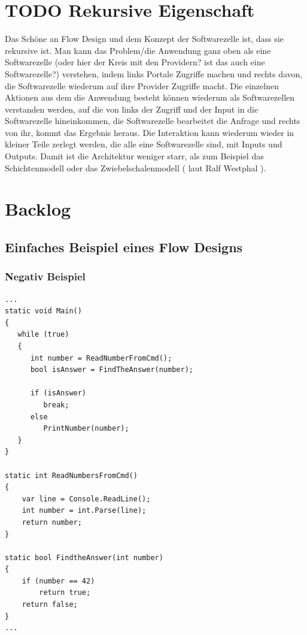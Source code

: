 \documentclass[a4paper,12pt,oneside]{book}
\begin{document}
\chapter{{\bfseries\sffamily TODO} Rekursive Eigenschaft}
\label{sec-6}
Das Schöne an Flow Design und dem Konzept der Softwarezelle ist, dass sie rekursive ist.
Man kann das Problem/die Anwendung ganz oben als eine Softwarezelle (oder hier der Kreis mit den Providern? ist das auch eine Softwarezelle?)
verstehen, indem links Portale Zugriffe machen und rechts davon, die Softwarezelle wiederum auf ihre Provider Zugriffe macht.
Die einzelnen Aktionen aus dem die Anwendung besteht können wiederum als Softwarezellen verstanden werden, auf die von links
der Zugriff und der Input in die Softwarezelle hineinkommen, die Softwarezelle bearbeitet die Anfrage und rechts von ihr, kommt das
Ergebnis heraus. Die Interaktion kann wiederum wieder in kleiner Teile zerlegt werden, die alle eine Softwarezelle sind, mit Inputs und
Outputs. Damit ist die Architektur weniger starr, als zum Beispiel das Schichtenmodell oder das Zwiebelschalenmodell ( laut Ralf Westphal ).



\chapter{Backlog}
\label{sec-7}
\section{Einfaches Beispiel eines Flow Designs}
\label{sec-7-1}
\subsection{Negativ Beispiel}
\label{sec-7-1-1}
\begin{verbatim}
...
static void Main()
{
   while (true)
   {
      int number = ReadNumberFromCmd();
      bool isAnswer = FindTheAnswer(number);

      if (isAnswer)
         break;
      else
         PrintNumber(number);
   }
}

static int ReadNumbersFromCmd()
{
    var line = Console.ReadLine();
    int number = int.Parse(line);
    return number;
}

static bool FindtheAnswer(int number)
{
    if (number == 42)
        return true;
    return false;
}
...
\end{verbatim}
\end{document}
